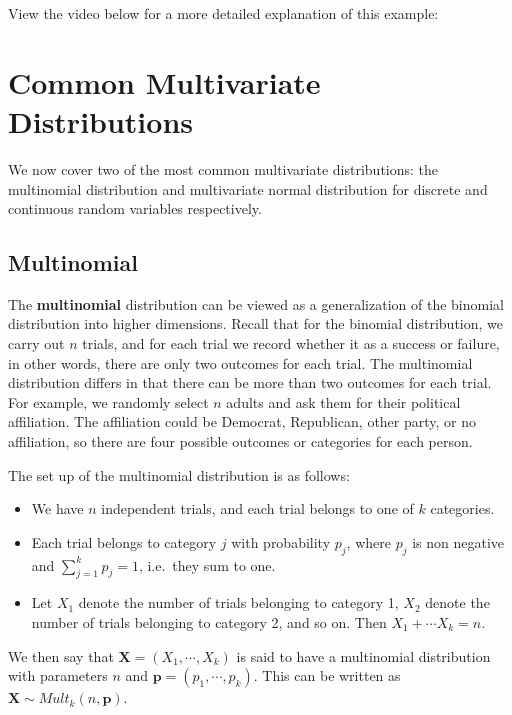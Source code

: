 \documentclass[
]{book}
\providecommand{\tightlist}{%
  \setlength{\itemsep}{0pt}\setlength{\parskip}{0pt}}
\begin{document}
View the video below for a more detailed explanation of this example:

\hypertarget{commMultDist}{%
\section{Common Multivariate Distributions}\label{commMultDist}}

We now cover two of the most common multivariate distributions: the multinomial distribution and multivariate normal distribution for discrete and continuous random variables respectively.

\hypertarget{multinomial}{%
\subsection{Multinomial}\label{multinomial}}

The \textbf{multinomial} distribution can be viewed as a generalization of the binomial distribution into higher dimensions. Recall that for the binomial distribution, we carry out \(n\) trials, and for each trial we record whether it as a success or failure, in other words, there are only two outcomes for each trial. The multinomial distribution differs in that there can be more than two outcomes for each trial. For example, we randomly select \(n\) adults and ask them for their political affiliation. The affiliation could be Democrat, Republican, other party, or no affiliation, so there are four possible outcomes or categories for each person.

The set up of the multinomial distribution is as follows:

\begin{itemize}
\tightlist
\item
  We have \(n\) independent trials, and each trial belongs to one of \(k\) categories.
\item
  Each trial belongs to category \(j\) with probability \(p_j\), where \(p_j\) is non negative and \(\sum_{j=1}^k p_j = 1\), i.e.~they sum to one.
\item
  Let \(X_1\) denote the number of trials belonging to category 1, \(X_2\) denote the number of trials belonging to category 2, and so on. Then \(X_1 + \cdots X_k = n\).
\end{itemize}

We then say that \(\boldsymbol{X} = (X_1, \cdots, X_k)\) is said to have a multinomial distribution with parameters \(n\) and \(\boldsymbol{p} = (p_1, \cdots, p_k)\). This can be written as \(\boldsymbol{X} \sim Mult_k(n, \boldsymbol{p})\).
\end{document}
